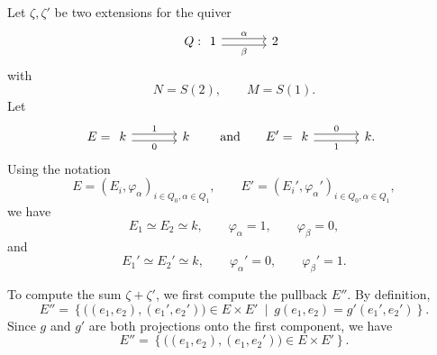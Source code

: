 \documentclass[11pt, a4paper]{report}
\begin{document}
    \begin{example}
        Let \(\zeta,\zeta'\) be two extensions for the quiver
        \[
        Q:
        \begin{tikzcd}[column sep=large]
        1
        \arrow[r, shift left=0.6ex, "\alpha"]
        \arrow[r, shift right=0.6ex, "\beta"']
        &
        2
        \end{tikzcd}
        \]
        with
        \[
        N=S(2),\qquad M=S(1).
        \]
        Let
        \[
        E=
        \begin{tikzcd}[column sep=large]
        k
        \arrow[r, shift left=0.6ex, "1"]
        \arrow[r, shift right=0.6ex, "0"']
        &
        k
        \end{tikzcd}
        \qquad\text{and}\qquad
        E'=
        \begin{tikzcd}[column sep=large]
        k
        \arrow[r, shift left=0.6ex, "0"]
        \arrow[r, shift right=0.6ex, "1"']
        &
        k .
        \end{tikzcd}
        \]
        Using the notation
        \[
        E=(E_i,\varphi_\alpha)_{i\in Q_0,\alpha\in Q_1},
        \qquad
        E'=(E_i',\varphi_\alpha')_{i\in Q_0,\alpha\in Q_1},
        \]
        we have
        \[
        E_1\simeq E_2\simeq k,
        \qquad
        \varphi_\alpha=1,\qquad
        \varphi_\beta=0,
        \]
        and
        \[
        E_1'\simeq E_2'\simeq k,
        \qquad
        \varphi_\alpha'=0,\qquad
        \varphi_\beta'=1.
        \]

        To compute the sum \(\zeta+\zeta'\), we first compute the pullback \(E''\).
        By definition,
        \[
        E''
        =
        \left\{
        \bigl((e_1,e_2),(e_1',e_2')\bigr)\in E\times E'
        \ \middle|\
        g(e_1,e_2)=g'(e_1',e_2')
        \right\}.
        \]
        Since \(g\) and \(g'\) are both projections onto the first component, we have
        \[
        E''
        =
        \left\{
        \bigl((e_1,e_2),(e_1,e_2')\bigr)\in E\times E'
        \right\}.
        \]


\end{example}
\end{document}
